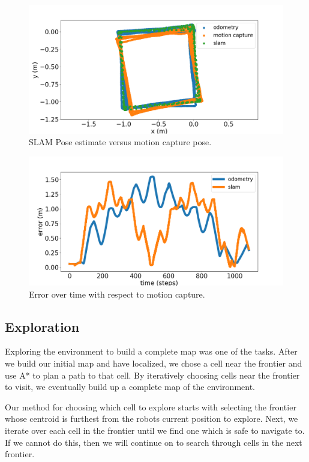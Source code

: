 \documentclass[journal]{IEEEtran}
\begin{document}
\begin{figure}[t]
    \centering
    \includegraphics[width=1\linewidth]{slam_squares.png}
    \caption{SLAM Pose estimate versus motion capture pose.}
    \label{fig:slam_squares}
\end{figure}

\begin{figure}
    \centering
    \includegraphics[width=1\linewidth]{slam_squares_error.png}
    \caption{Error over time with respect to motion capture.}
    \label{fig:slam_squares_error.}
\end{figure}

\subsection{Exploration}

Exploring the environment to build a complete map was one of the tasks. After we build our initial map and have localized, we chose a cell near the frontier and use A* to plan a path to that cell. By iteratively choosing cells near the frontier to visit, we eventually build up a complete map of the environment.

Our method for choosing which cell to explore starts with selecting the frontier whose centroid is furthest from the robots current position to explore. Next, we iterate over each cell in the frontier until we find one which is safe to navigate to. If we cannot do this, then we will continue on to search through cells in the next frontier.
\end{document}
